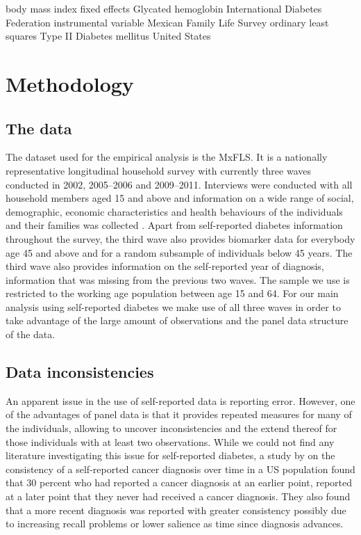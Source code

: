 \begin{acronym}
 {body mass index}
 {fixed effects}
 {Glycated hemoglobin}
 {International Diabetes Federation}
 {instrumental variable}
 {Mexican Family Life Survey}
 {ordinary least squares}
 {Type II Diabetes mellitus}
 {United States}
\end{acronym}

\section{Methodology}
\subsection{The data}
The dataset used for the empirical analysis is the \acf{MxFLS}.
It is a nationally representative longitudinal household survey with
currently three waves conducted in 2002, 2005--2006 and 2009--2011.
Interviews were conducted with all household members aged 15 and above
and information on a wide range of social, demographic, economic characteristics
and health behaviours of the individuals and their families was collected
\citep{Rubalcava2013}. Apart from self-reported diabetes information
throughout the survey, the third wave also provides biomarker data
for everybody age 45 and above and for a random subsample of individuals
below 45 years. The third wave also provides information on the self-reported
year of diagnosis, information that was missing from the previous
two waves. The sample we use is restricted to the working age population
between age 15 and 64. For our main analysis using self-reported diabetes
we make use of all three waves in order to take advantage of the large
amount of observations and the panel data structure of the data.
\subsection{Data inconsistencies}

An apparent issue in the use of self-reported data is reporting error.
However, one of the advantages of panel data is that it provides repeated
measures for many of the individuals, allowing to uncover inconsistencies
and the extend thereof for those individuals with at least two observations.
While we could not find any literature investigating this issue for
self-reported diabetes, a study by \citet{Zajacova2010} on the consistency
of a self-reported cancer diagnosis over time in a US population found
that 30 percent who had reported a cancer diagnosis at an earlier
point, reported at a later point that they never had received a cancer
diagnosis. They also found that a more recent diagnosis was reported
with greater consistency possibly due to increasing recall problems
or lower salience as time since diagnosis advances. 

